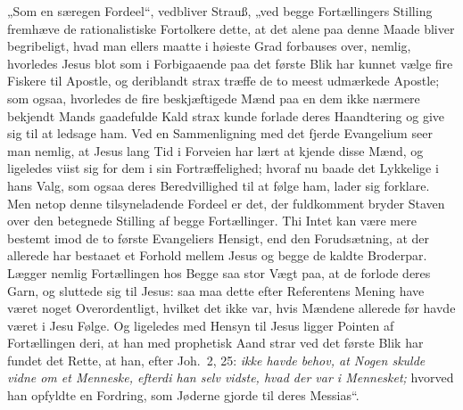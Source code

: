 \documentclass[12pt,a4paper]{book}
\begin{document}
„Som en særegen Fordeel“, vedbliver Strauß, „ved begge Fortællingers Stilling
fremhæve de rationalistiske Fortolkere dette, at det alene paa denne Maade bliver
begribeligt, hvad man ellers maatte i høieste Grad forbauses over, nemlig,
hvorledes Jesus blot som i Forbigaaende paa det første Blik har kunnet vælge fire
Fiskere til Apostle, og deriblandt strax træffe de to meest udmærkede Apostle;
som ogsaa, hvorledes de fire beskjæftigede Mænd paa en dem ikke nærmere bekjendt
Mands gaadefulde Kald strax kunde forlade deres Haandtering og give sig til at
ledsage ham. Ved en
Sammenligning med det fjerde Evangelium seer man nemlig, at Jesus lang Tid i
Forveien har lært at kjende disse Mænd, og ligeledes viist sig for dem i sin
Fortræffelighed; hvoraf nu baade det Lykkelige i hans Valg, som ogsaa deres
Beredvillighed til at følge ham, lader sig forklare. Men netop denne
tilsyneladende Fordeel er det, der fuldkomment bryder Staven over den betegnede
Stilling af begge Fortællinger. Thi Intet kan være mere bestemt imod de to første
Evangeliers Hensigt, end den Forudsætning, at der allerede har bestaaet et
Forhold mellem Jesus og begge de kaldte Broderpar. Lægger nemlig Fortællingen hos
Begge saa stor Vægt paa, at de forlode deres Garn, og sluttede sig til Jesus: saa
maa dette efter Referentens Mening have været noget Overordentligt, hvilket det
ikke var, hvis Mændene allerede før havde været i Jesu Følge. Og ligeledes med
Hensyn til Jesus ligger Pointen af Fortællingen deri, at han med prophetisk Aand
strar ved det første Blik har fundet det Rette, at han, efter Joh.\ 2, 25:
\emph{ikke havde behov, at Nogen skulde vidne om et Menneske, efterdi han selv
vidste, hvad der var i Mennesket;} hvorved han opfyldte en Fordring, som Jøderne
gjorde til deres Messias“.
\end{document}
